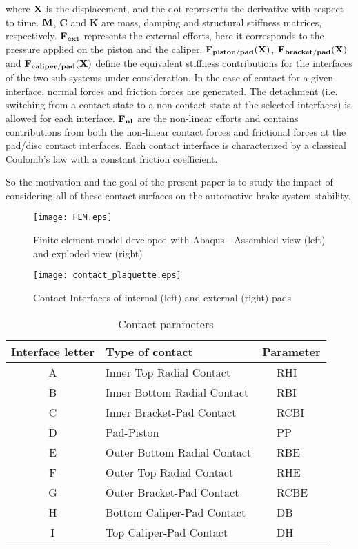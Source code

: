 \documentclass[final,1p]{elsarticle}
\begin{document}
where $\bf{X}$ is the displacement, and the dot represents the derivative with respect to time. $\bf{M}$, $\textbf{C}$ and $\textbf{K}$ are mass, damping and structural stiffness matrices, respectively. $\bf{F}_{ext}$ represents the external efforts, here it corresponds to the pressure applied on the piston and the caliper. $\bf{F}_{piston/pad}(\textbf{X})$, $\bf{F}_{bracket/pad}(\textbf{X})$ and $\bf{F}_{caliper/pad}(\bf{X})$ define the equivalent stiffness contributions for the interfaces of the two sub-systems under consideration. In the case of contact for a given interface, normal forces and friction forces are generated. The detachment (i.e. switching from a contact state to a non-contact state at the selected interfaces) is allowed for each interface. $\bf{F_{nl}}$ are the non-linear efforts and contains contributions from both the non-linear contact forces and frictional forces at the pad/disc contact interfaces. Each contact interface  is characterized by a classical Coulomb's law with a constant friction coefficient. 

So the motivation and the goal of the present paper is to study the impact of considering all of these contact surfaces on the automotive brake system stability. 


\begin{figure}[h!]
\centering
\texttt{[image: FEM.eps]}
\caption{Finite element model developed with Abaqus - Assembled view (left) and exploded view (right)}
\label{fig:FEM}
\end{figure}
\begin{figure}[h!]
\centering
\texttt{[image: contact\_plaquette.eps]}
\caption{Contact Interfaces of internal (left) and external (right) pads}
\label{fig:PadsContact}
\end{figure}

\begin{table}[h!]
\centering
\caption{Contact parameters}
\begin{tabularx}{\hsize}{cXll}
\toprule
\textbf{Interface letter} & \textbf{Type of contact} &  \multicolumn{2}{c}{\textbf{Parameter}}\\
\midrule
A & Inner Top Radial Contact  && RHI \\
B & Inner Bottom Radial Contact && RBI \\
C & Inner Bracket-Pad Contact && RCBI \\
D & Pad-Piston && PP \\
E & Outer Bottom Radial Contact && RBE \\
F & Outer Top Radial Contact && RHE \\
G & Outer Bracket-Pad Contact && RCBE \\
H & Bottom Caliper-Pad Contact && DB \\
I & Top Caliper-Pad Contact && DH \\
\bottomrule
\end{tabularx}
\label{tab:PadsContact}
\end{table}
\end{document}
